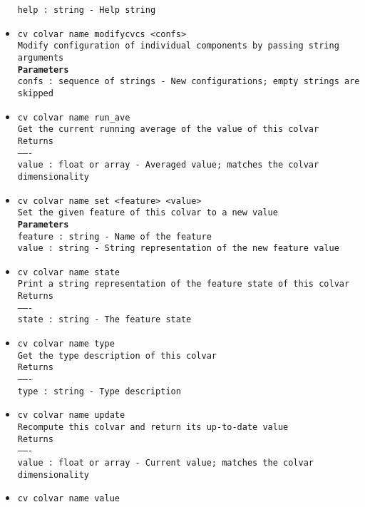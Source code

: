 \begin{itemize}
\texttt{help : string - Help string}
\item \texttt{cv colvar name modifycvcs <confs>}
\\
\texttt{Modify configuration of individual components by passing string arguments}
\\
\texttt{\textbf{Parameters}}
\\
\texttt{confs : sequence of strings - New configurations; empty strings are skipped}
\item \texttt{cv colvar name run\_ave}
\\
\texttt{Get the current running average of the value of this colvar}
\\
\texttt{Returns}
\\
\texttt{-------}
\\
\texttt{value : float or array - Averaged value; matches the colvar dimensionality}
\item \texttt{cv colvar name set <feature> <value>}
\\
\texttt{Set the given feature of this colvar to a new value}
\\
\texttt{\textbf{Parameters}}
\\
\texttt{feature : string - Name of the feature}
\\
\texttt{value : string - String representation of the new feature value}
\item \texttt{cv colvar name state}
\\
\texttt{Print a string representation of the feature state of this colvar}
\\
\texttt{Returns}
\\
\texttt{-------}
\\
\texttt{state : string - The feature state}
\item \texttt{cv colvar name type}
\\
\texttt{Get the type description of this colvar}
\\
\texttt{Returns}
\\
\texttt{-------}
\\
\texttt{type : string - Type description}
\item \texttt{cv colvar name update}
\\
\texttt{Recompute this colvar and return its up-to-date value}
\\
\texttt{Returns}
\\
\texttt{-------}
\\
\texttt{value : float or array - Current value; matches the colvar dimensionality}
\item \texttt{cv colvar name value}

\end{itemize}
